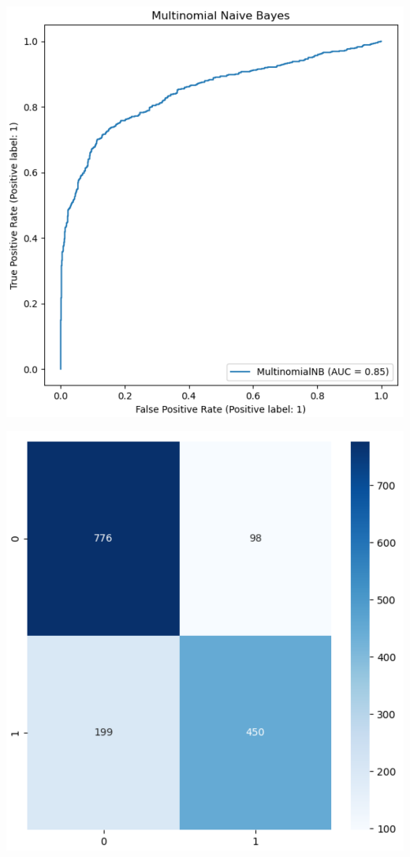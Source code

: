 \documentclass[11pt]{article}
\begin{document}
\begin{minipage}[t]{.45\linewidth}
\includegraphics[width=\linewidth]{images/mnb_plot.png}
\end{minipage}\hfill
\begin{minipage}[b]{.45\linewidth}
\includegraphics[width=\linewidth]{images/mnb_heatmap.png}
\end{minipage}\hfill
\end{document}
